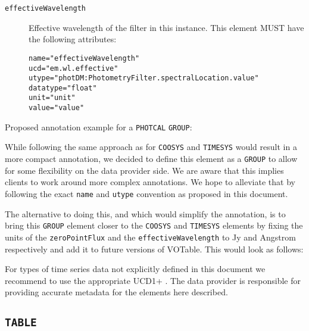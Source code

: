 \documentclass[11pt,a4paper]{ivoa}
\let\fg=\color
\def\attr#1{{\tt{\fg{DarkRed}#1}}}
\def\elem#1{{\tt{\fg{DarkRed}#1}}}
\def\attrval#1#2{{\tt{\fg{DarkRed}#1}="{\fg{DarkPurple}#2}"}}
\begin{document}
\begin{description}
\item[\elem{effectiveWavelength}] Effective wavelength of the filter in this instance. This element MUST have the following attributes:
\begin{description}
    \item[\attrval{name}{effectiveWavelength}]
    \item[\attrval{ucd}{em.wl.effective}]
    \item[\attrval{utype}{photDM:PhotometryFilter.spectralLocation.value}] 
    \item[\attrval{datatype}{float}]
    \item[\attrval{unit}{unit}]
    \item[\attrval{value}{value}]
\end{description}
\end{description}

Proposed annotation example for a \texttt{PHOTCAL} \elem{GROUP}: 



While following the same approach as for \elem{COOSYS} and \elem{TIMESYS} would result in a more compact annotation, we decided to define this element as a \elem{GROUP} to allow for some flexibility on the data provider side. We are aware that this implies clients to work around more complex annotations. We hope to alleviate that by following the exact \attr{name} and \attr{utype} convention as proposed in this document.

The alternative to doing this, and which would simplify the annotation, is to bring this \elem{GROUP} element closer to the \elem{COOSYS} and \elem{TIMESYS} elements by fixing the units of the \attr{zeroPointFlux} and the \attr{effectiveWavelength} to Jy and Angstrom respectively and add it to future versions of VOTable. This would look as follows: 




%

For types of time series data not explicitly defined in this document we recommend to use the appropriate UCD1+ \citep{2005ivoa.spec.0819D}. The data provider is responsible for providing accurate metadata for the elements here described.


%
\subsection{\elem{TABLE}}
\end{document}
